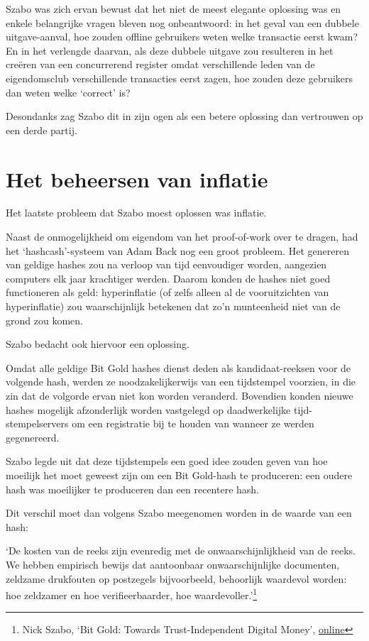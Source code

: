 \documentclass[smalldemyvopaper,11pt,twoside,onecolumn,openright,extrafontsizes,hidelinks]{memoir}
\begin{document}
Szabo was zich ervan bewust dat het niet de meest elegante oplossing was
en enkele belangrijke vragen bleven nog onbeantwoord: in het geval van
een dubbele uitgave-aanval, hoe zouden offline gebruikers weten welke
transactie eerst kwam? En in het verlengde daarvan, als deze dubbele
uitgave zou resulteren in het creëren van een concurrerend register
omdat verschillende leden van de eigendomsclub verschillende transacties
eerst zagen, hoe zouden deze gebruikers dan weten welke `correct' is?

Desondanks zag Szabo dit in zijn ogen als een betere oplossing dan
vertrouwen op een derde partij.

\section{Het beheersen van inflatie}\label{het-beheersen-van-inflatie}

Het laatste probleem dat Szabo moest oplossen was inflatie.

Naast de onmogelijkheid om eigendom van het proof-of-work over te
dragen, had het `hashcash'-systeem van Adam Back nog een groot probleem.
Het genereren van geldige hashes zou na verloop van tijd eenvoudiger
worden, aangezien computers elk jaar krachtiger werden. Daarom konden de
hashes niet goed functioneren als geld: hyperinflatie (of zelfs alleen
al de vooruitzichten van hyperinflatie) zou waarschijnlijk betekenen dat
zo'n munteenheid niet van de grond zou komen.

Szabo bedacht ook hiervoor een oplossing.

Omdat alle geldige Bit Gold hashes dienst deden als kandidaat-reeksen
voor de volgende hash, werden ze noodzakelijkerwijs van een tijdstempel
voorzien, in die zin dat de volgorde ervan niet kon worden veranderd.
Bovendien konden nieuwe hashes mogelijk afzonderlijk worden vastgelegd
op daadwerkelijke tijd-stempelservers om een registratie bij te houden
van wanneer ze werden gegenereerd.

Szabo legde uit dat deze tijdstempels een goed idee zouden geven van hoe
moeilijk het moet geweest zijn om een Bit Gold-hash te produceren: een
oudere hash was moeilijker te produceren dan een recentere hash.

Dit verschil moet dan volgens Szabo meegenomen worden in de waarde van
een hash:

`De kosten van de reeks zijn evenredig met de onwaarschijnlijkheid van
de reeks. We hebben empirisch bewijs dat aantoonbaar onwaarschijnlijke
documenten, zeldzame drukfouten op postzegels bijvoorbeeld, behoorlijk
waardevol worden: hoe zeldzamer en hoe verifieerbaarder, hoe
waardevoller.'\footnote{Nick Szabo, `Bit Gold: Towards Trust-Independent
  Digital Money',
  \href{https://web.archive.org/web/20140406003811/http://szabo.best.vwh.net/bitgold.html}{online}}
\end{document}
